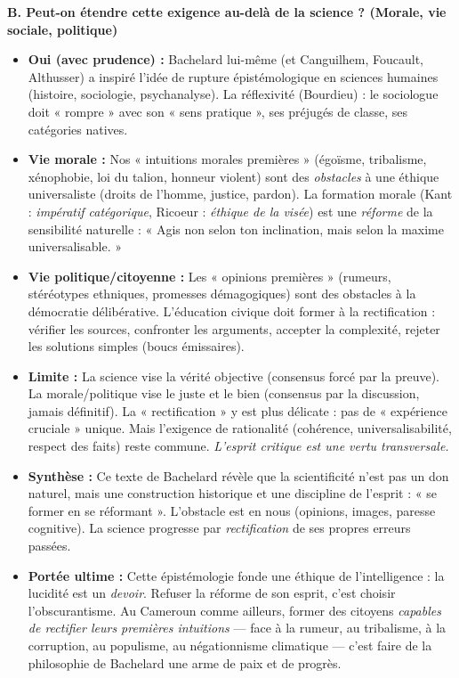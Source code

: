 \documentclass[11pt]{article}
\newcommand{\cle}[1]{{\popxbold\color{popdark}#1}}
\newcounter{popsec}
\newcounter{popsub}
\newcommand{\courssub}[1]{%
  \stepcounter{popsub}%
  \par\vspace{9pt}\noindent{\popxbold\fontsize{11.5}{13}\selectfont\color{popink}{\color{poporange}\thepopsec.\thepopsub}\hspace{6pt}#1}\par\nopagebreak\vspace{4pt}
}
\begin{document}
\begin{corrige}
\textbf{B. Peut-on étendre cette exigence au-delà de la science ? (Morale, vie sociale, politique)}
\begin{itemize}
\item \textbf{Oui (avec prudence) :} Bachelard lui-même (et Canguilhem, Foucault, Althusser) a inspiré l'idée de \cle{rupture épistémologique} en sciences humaines (histoire, sociologie, psychanalyse). La \cle{réflexivité} (Bourdieu) : le sociologue doit « rompre » avec son « sens pratique », ses préjugés de classe, ses catégories natives.
\item \textbf{Vie morale :} Nos « intuitions morales premières » (égoïsme, tribalisme, xénophobie, loi du talion, honneur violent) sont des \emph{obstacles} à une éthique universaliste (droits de l'homme, justice, pardon). La \cle{formation morale} (Kant : \emph{impératif catégorique}, Ricoeur : \emph{éthique de la visée}) est une \emph{réforme} de la sensibilité naturelle : « Agis non selon ton inclination, mais selon la maxime universalisable. »
\item \textbf{Vie politique/citoyenne :} Les « opinions premières » (rumeurs, stéréotypes ethniques, promesses démagogiques) sont des obstacles à la \cle{démocratie délibérative}. L'\cle{éducation civique} doit former à la \cle{rectification} : vérifier les sources, confronter les arguments, accepter la complexité, rejeter les solutions simples (boucs émissaires).
\item \textbf{Limite :} La science vise la \cle{vérité objective} (consensus forcé par la preuve). La morale/politique vise le \cle{juste} et le \cle{bien} (consensus par la discussion, jamais définitif). La « rectification » y est plus délicate : pas de « expérience cruciale » unique. Mais l'\cle{exigence de rationalité} (cohérence, universalisabilité, respect des faits) reste commune. \emph{L'esprit critique est une vertu transversale.}
\end{itemize}

\courssub{Conclusion}
\begin{itemize}
\item \textbf{Synthèse :} Ce texte de Bachelard révèle que la scientificité n'est pas un don naturel, mais une \cle{construction historique} et une \cle{discipline de l'esprit} : « se former en se réformant ». L'obstacle est en nous (opinions, images, paresse cognitive). La science progresse par \emph{rectification} de ses propres erreurs passées.
\item \textbf{Portée ultime :} Cette épistémologie fonde une \cle{éthique de l'intelligence} : la lucidité est un \emph{devoir}. Refuser la réforme de son esprit, c'est choisir l'obscurantisme. Au Cameroun comme ailleurs, former des citoyens \emph{capables de rectifier leurs premières intuitions} — face à la rumeur, au tribalisme, à la corruption, au populisme, au négationnisme climatique — c'est faire de la philosophie de Bachelard une \cle{arme de paix et de progrès}.
\end{itemize}
\end{corrige}
\end{document}
